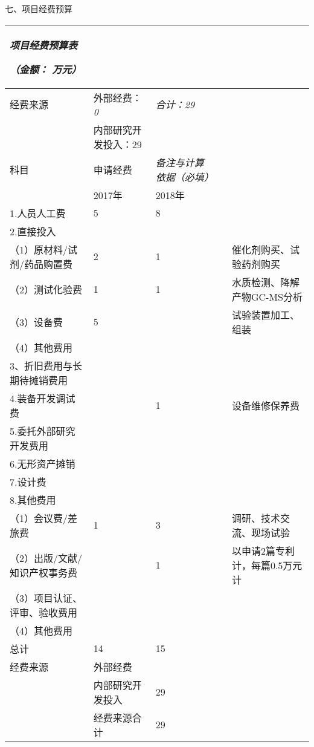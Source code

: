 \documentclass[
]{article}
\date{}
\begin{document}
七、项目经费预算

\begin{longtable}[]{@{}lllll@{}}
\toprule
\begin{minipage}[b]{0.17\columnwidth}\raggedright
\emph{\textbf{项目经费预算表}}

\emph{（金额： 万元）}\strut
\end{minipage} & \begin{minipage}[b]{0.17\columnwidth}\raggedright
\strut
\end{minipage} & \begin{minipage}[b]{0.17\columnwidth}\raggedright
\strut
\end{minipage} & \begin{minipage}[b]{0.17\columnwidth}\raggedright
\strut
\end{minipage} & \begin{minipage}[b]{0.17\columnwidth}\raggedright
\strut
\end{minipage}\tabularnewline
\midrule
\endhead
经费来源 & 外部经费： \emph{0} & \emph{合计：29} & &\tabularnewline
& 内部研究开发投入：29 & & &\tabularnewline
科目 & 申请经费 & \emph{备注与计算依据（必填）} & &\tabularnewline
& 2017年 & 2018年 & &\tabularnewline
1.人员人工费 & 5 & 8 & &\tabularnewline
2.直接投入 & & & &\tabularnewline
（1）原材料/试剂/药品购置费 & 2 & 1 & &
催化剂购买、试验药剂购买\tabularnewline
（2）测试化验费 & 1 & 1 & & 水质检测、降解产物GC-MS分析\tabularnewline
（3）设备费 & 5 & & & 试验装置加工、组装\tabularnewline
（4）其他费用 & & & &\tabularnewline
3、折旧费用与长期待摊销费用 & & & &\tabularnewline
4.装备开发调试费 & & 1 & & 设备维修保养费\tabularnewline
5.委托外部研究开发费用 & & & &\tabularnewline
6.无形资产摊销 & & & &\tabularnewline
7.设计费 & & & &\tabularnewline
8.其他费用 & & & &\tabularnewline
（1）会议费/差旅费 & 1 & 3 & & 调研、技术交流、现场试验\tabularnewline
（2）出版/文献/知识产权事务费 & & 1 & &
以申请2篇专利计，每篇0.5万元计\tabularnewline
（3）项目认证、评审、验收费用 & & & &\tabularnewline
（4）其他费用 & & & &\tabularnewline
总计 & 14 & 15 & &\tabularnewline
经费来源 & 外部经费 & & &\tabularnewline
& 内部研究开发投入 & 29 & &\tabularnewline
& 经费来源合计 & 29 & &\tabularnewline
\bottomrule
\end{longtable}
\end{document}
